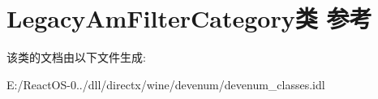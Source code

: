 \hypertarget{class_legacy_am_filter_category}{}\section{Legacy\+Am\+Filter\+Category类 参考}
\label{class_legacy_am_filter_category}


该类的文档由以下文件生成\+:\begin{DoxyCompactItemize}
\item 
E\+:/\+React\+O\+S-\/0../dll/directx/wine/devenum/devenum\+\_\+classes.\+idl\end{DoxyCompactItemize}
